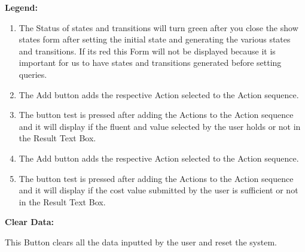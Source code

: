 \documentclass[12pt]{article}
\begin{document}

\par


\vspace{\baselineskip}
\textbf{Legend:}\par


\vspace{\baselineskip}
\begin{enumerate}
	\item The Status of states and transitions will turn green after you close the show states form after setting the initial state and generating the various states and transitions. If its red this Form will not be displayed because it is important for us to have states and transitions generated before setting queries.\par

	\item The Add button adds the respective Action selected to the Action sequence.\par

	\item The button test is pressed after adding the Actions to the Action sequence and it will display if the fluent and value selected by the user holds or not in the Result Text Box.\par

	\item The Add button adds the respective Action selected to the Action sequence.\par

	\item The button test is pressed after adding the Actions to the Action sequence and it will display if the cost value submitted by the user is sufficient or not in the Result Text Box.
\end{enumerate}\par


\vspace{\baselineskip}
\textbf{Clear Data:}\par


\vspace{\baselineskip}
This Button clears all the data inputted by the user and reset the system.\par


\vspace{\baselineskip}

\vspace{\baselineskip}
\end{document}

